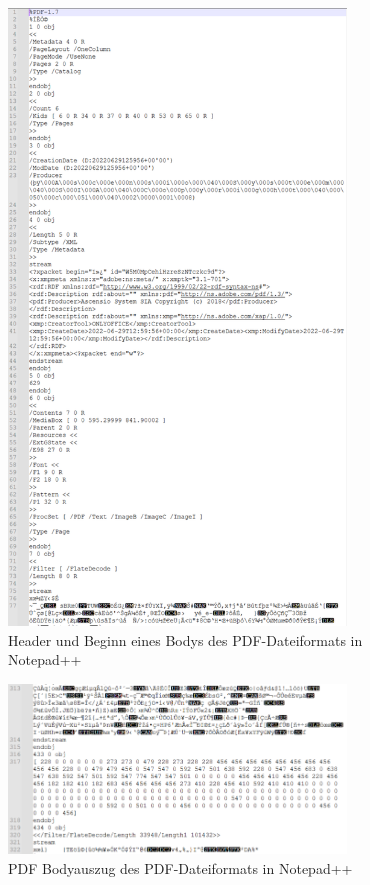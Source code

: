 \begin{figure}[!htb]
	\centering
	\includegraphics[width=0.8\textwidth]{"images/pdf_header2-notepad.png"}
	\caption{Header und Beginn eines Bodys des PDF-Dateiformats in Notepad++}
	\label{fig:header1}
\end{figure}

\begin{figure}[!htb]
	\centering
	\includegraphics[width=0.8\textwidth]{"images/pdf_body2-notepad.png"}
	\caption{PDF Bodyauszug des PDF-Dateiformats in Notepad++}
	\label{fig:body}
\end{figure}

